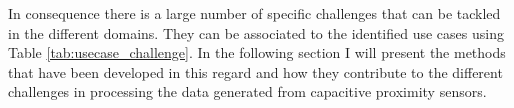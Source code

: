 In consequence there is a large number of specific challenges that can be tackled in the different domains. They can be associated to the identified use cases using Table \ref{tab:usecase_challenge}. In the following section I will present the methods that have been developed in this regard and how they contribute to the different challenges in processing the data generated from capacitive proximity sensors.

   